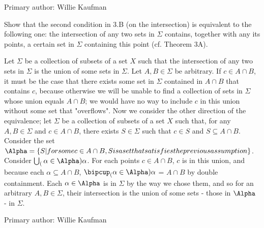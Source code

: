 Primary author: Willie Kaufman

\begin{majorEx}%
Show that the second condition in 3.B (on the intersection) is equivalent to the following one: the intersection of any two sets in $\Sigma$ contains, together with any its points, a certain set in $\Sigma$ containing this point (cf. Theorem 3A).
\end{majorEx}
Let $\Sigma$ be a collection of subsets of a set $X$ such that the intersection of any two sets in $\Sigma$ is the union of some sets in $\Sigma$. Let $A, B \in \Sigma$ be arbitrary. If $c \in A \cap B$, it must be the case that there exists some set in $\Sigma$ contained in $A \cap B$ that contains $c$, because otherwise we will be unable to find a collection of sets in $\Sigma$ whose union equals $A \cap B$; we would have no way to include $c$ in this union without some set that "overflows".
Now we consider the other direction of the equivalence; let $\Sigma$ be a collection of subsets of a set $X$ such that, for any $A, B \in \Sigma$ and $c \in A \cap B$, there exists $S \in \Sigma$ such that $c \in S$ and $S \subseteq A \cap B$. Consider the set $\Alpha = \{S | for some c \in A \cap B, S is a set that satisfies the previous assumption\}$. Consider $\bigcup_(\alpha \in \Alpha) \alpha$. For each points $c \in A \cap B$, $c$ is in this union, and because each $\alpha \subseteq A \cap B$, $\bipcup_(\alpha \in \Alpha) \alpha$ = $A \cap B$ by double containment. Each $\alpha \in \Alpha$ is in $\Sigma$ by the way we chose them, and so for an arbitrary $A, B \in \Sigma$, their intersection is the union of some sets - those in $\Alpha$ - in $\Sigma$.

Primary author: Willie Kaufman
